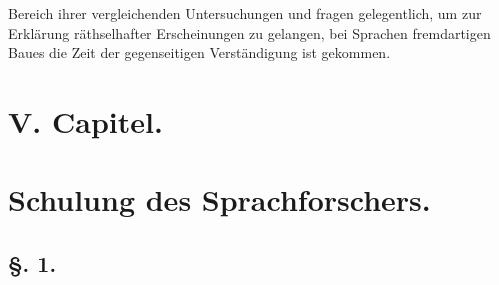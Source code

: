 Bereich ihrer vergleichenden Untersuchungen und fragen gelegentlich, um zur Erklärung räthselhafter Erscheinungen zu gelangen, bei Sprachen fremdartigen Baues  die Zeit der gegenseitigen Verständigung ist gekommen.

\begin{styleAnmerk}
\end{styleAnmerk}

\label{fp.31}

\clearpage{}
\section*{V. Capitel.}
\section*{Schulung des Sprachforschers.}
\subsection*{§. 1.}\label{I.V.1}

